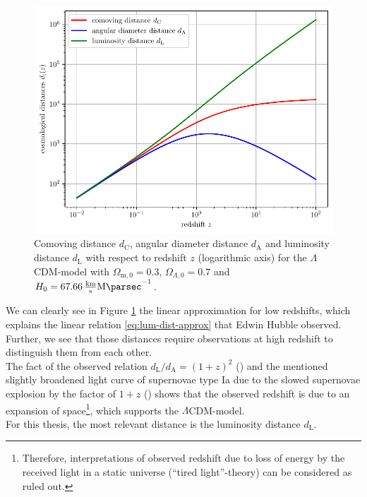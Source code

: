\begin{figure}[H]
    \centering
    \includegraphics[scale=0.9]{figures/plots/PDF/redshift-vs-cosmological-distances.pdf}
    \caption{Comoving distance $d_{\text{C}}$, angular diameter distance $d_{\text{A}}$ and luminosity distance $d_{\text{L}}$ with respect to redshift $z$ (logarithmic axis) for the $\Lambda$CDM-model with $\Omega_{\text{m},0} = 0.3$, $\Omega_{\Lambda,0} = 0.7$ and $H_{0} = \SI{67.66}{\frac{\kilo \meter}{\second} \mega \parsec^{-1}}$.}
    \label{fig:redshift-vs-cosmological-distances}
\end{figure}

\noindent We can clearly see in Figure \ref{fig:redshift-vs-cosmological-distances} the linear approximation for low redshifts, which explains the linear relation \eqref{eq:lum-dist-approx} that Edwin Hubble observed. Further, we see that those distances require observations at high redshift to distinguish them from each other. \\
The fact of the observed relation $\displaystyle d_{\text{L}}/d_{\text{A}} = (1 + z)^2$ (\cite[p.~58]{Weinberg2008}) and the mentioned slightly broadened light curve of supernovae type Ia due to the slowed supernovae explosion by the factor of $1 + z$ (\cite[p.~10/11]{Goldhaber2001}) shows that the observed redshift is due to an expansion of space\footnote{Therefore, interpretations of observed redshift due to loss of energy by the received light in a static universe (``tired light''-theory) can be considered as ruled out.}, which supports the $\Lambda$CDM-model. \\
\noindent For this thesis, the most relevant distance is the luminosity distance $d_{\text{L}}$.
